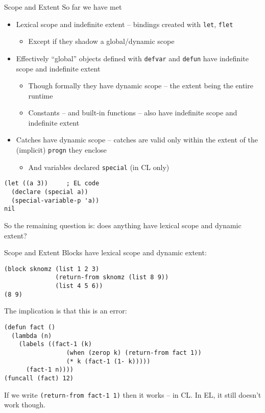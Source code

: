 \documentclass[presentation]{beamer}
\begin{document}
\begin{frame}[fragile]{Scope and Extent}
So far we have met
\begin{itemize}
\item Lexical scope and indefinite extent -- bindings created with \texttt{let}, \texttt{flet}
  \begin{itemize}
  \item Except if they shadow a global/dynamic scope
  \end{itemize}
\item Effectively ``global'' objects defined with \texttt{defvar} and \texttt{defun} have indefinite scope and indefinite extent
  \begin{itemize}
  \item Though formally they have dynamic scope -- the extent being the entire runtime
  \item Constants -- and built-in functions -- also have indefinite scope and indefinite extent
  \end{itemize}
\item Catches have dynamic scope -- catches are valid only within the extent of the (implicit) \texttt{progn} they enclose
  \begin{itemize}
  \item And variables declared \texttt{special} (in CL only)
  \end{itemize}
\end{itemize}
\begin{verbatim}
(let ((a 3))     ; EL code
  (declare (special a))
  (special-variable-p 'a))
nil
\end{verbatim}
So the remaining question is: does anything have lexical scope and dynamic extent?
\end{frame}

\begin{frame}[fragile]{Scope and Extent}
Blocks have lexical scope and dynamic extent:
\begin{verbatim}
(block sknomz (list 1 2 3)
              (return-from sknomz (list 8 9))
              (list 4 5 6))
(8 9)
\end{verbatim}

The implication is that this is an error:
\begin{verbatim}
(defun fact ()
  (lambda (n)
    (labels ((fact-1 (k)
                 (when (zerop k) (return-from fact 1))
                 (* k (fact-1 (1- k)))))
      (fact-1 n))))
(funcall (fact) 12)
\end{verbatim}

If we write \texttt{(return-from fact-1 1)} then it works -- in CL.  In EL, it still doesn't work though.
\end{frame}
\end{document}
